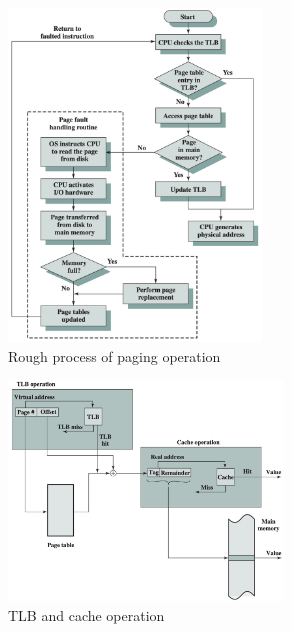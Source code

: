 \begin{figure}[H]
    \centering
    \includegraphics[width=0.6\textwidth]{chaps/memory/virtual-memory/virtual-memory-paging-process.png}
    \caption{Rough process of paging operation}
\end{figure}

\begin{figure}[H]
    \centering
    \includegraphics[width=0.65\textwidth]{chaps/memory/virtual-memory/tlb-operation.png}
    \caption{TLB and cache operation}
\end{figure}